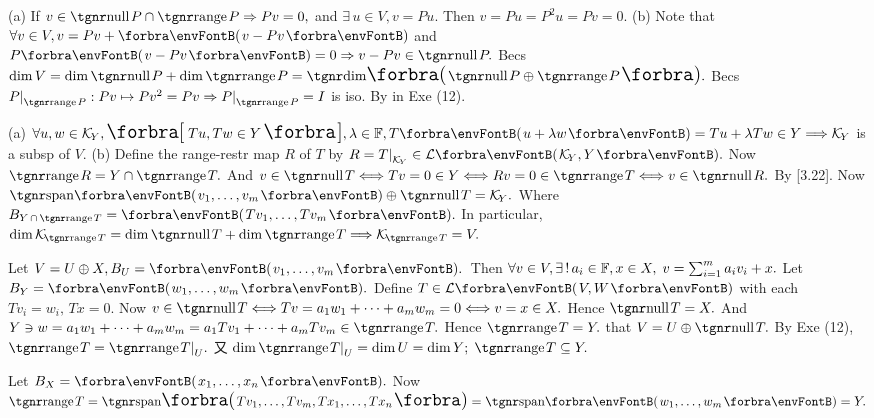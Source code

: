 (a) If $v\in\null P\cap\range P\Rightarrow Pv=0,$ and $\exists\,u\in V,v=Pu.$ Then $v=Pu=P^2 u=Pv=0.$\parSol{}
(b) Note that $\forall v\in V,v=Pv+\Par{v-Pv}$ and $P\Par{v-Pv}=0\Rightarrow v-Pv\in\null P.$\parSol{\Hb}
\Or Becs $\dim V=\dim\null P+\dim\range P=\Dim\BigPar{\null P\oplus\range P}.$\PfEnd{\vspace{3pt}}\parSol{}
\Or Becs $P\mmid_{\range P}:Pv\mapsto Pv^2=Pv\Rightarrow P\mmid_{\range P}=I$ is iso. By {\COROLLARY} in Exe (12).\PfEnd
\SepLine

(a) $\forall u,w\in\mathcal{K}_{\!Y},\Sbra{\,Tu,Tw\in Y\,},\lambda\in\Fbb,T\Par{u+\lambda w}=Tu+\lambda Tw\in Y\Longrightarrow \mathcal{K}_{\!Y}$ is a subsp of $V.$\vspace{2pt}\parSol{}
(b) Define the range-restr map $R$ of $T$ by $R=T\mmid_{\mathcal{K}_{\!Y}}\in\Lm{\mathcal{K}_{\!Y},Y}.$ Now $\range R=Y\cap \range T.$\parSol{\Hb}
And $v\in\null T\Longleftrightarrow Tv=0\in Y\Longleftrightarrow Rv=0\in\range T\Longleftrightarrow v\in\null R.$ By [3.22].\PfEnd\vspace{2pt}
\AComm Now $\Span{v_1,\dots,v_m}\oplus\null T=\mathcal{K}_{\!Y}.$ {Where $B_{Y\,\cap\,\range T}=\Par{Tv_1,\dots,Tv_m}.$}\vspace{0pt}\parCom
In particular, $\dim\mathcal{K}_{\!\range T}=\dim\null T+\dim\range T\Longrightarrow\mathcal{K}_{\!\range T}=V.$
\SepLine

Let $V=U\oplus X,B_U=\Par{v_1,\dots,v_m}.$ \,Then $\forall v\in V,\exists\,!\,a_i\in{\mathbb{F}},x\in X,\;v=\sum_{i=1}^m a_i v_i+x.$\parSol{}
Let $B_Y=\Par{w_1,\dots,w_m}.$ Define $T\in\Lm{V,W}$ with each $T{v_i}=w_i,\,Tx=0.$\parSol{}
Now $v\in\null T\Longleftrightarrow Tv=a_1w_1+\dots+a_mw_m=0\Longleftrightarrow v=x\in X.$ \;Hence $\null T=X.$\parSol{}
And $Y\ni w=a_1 w_1+\dots+a_m w_m=a_1 Tv_1+\dots+a_m Tv_m\in\range T.$ \;Hence $\range T=Y.$\parSol{}
\Or \NOTICE that $V=U\oplus\null T.$ By Exe (12), $\range T=\range T\mmid_U.$\parSol{}
{\Blind{\Or}}又 $\dim\range T\mmid_U=\dim U=\dim Y;\;\range T\subseteq Y.$\par\quad
\Or Let $B_X=\Par{x_1,\dots,x_n}.$ Now $\range T=\Span[\BigPar]{Tv_1,\dots,Tv_m,Tx_1,\dots,Tx_n}=\Span{w_1,\dots,w_m}=Y.$\PfEnd
\SepLine

